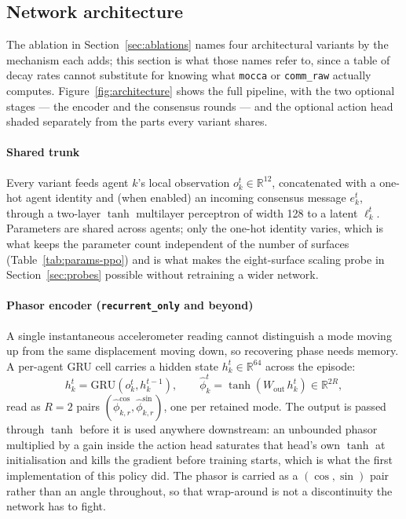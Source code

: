 \documentclass[preprint,11pt,authoryear]{elsarticle}
\begin{document}
\subsection{Network architecture}
\label{sec:architecture}

The ablation in Section~\ref{sec:ablations} names four architectural variants
by the mechanism each adds; this section is what those names refer to, since a
table of decay rates cannot substitute for knowing what \texttt{mocca} or
\texttt{comm\_raw} actually computes. Figure~\ref{fig:architecture} shows the
full pipeline, with the two optional stages --- the encoder and the consensus
rounds --- and the optional action head shaded separately from the parts every
variant shares.

\paragraph{Shared trunk}
Every variant feeds agent $k$'s local observation $o_k^t \in \mathbb{R}^{12}$,
concatenated with a one-hot agent identity and (when enabled) an incoming
consensus message $e_k^t$, through a two-layer $\tanh$ multilayer perceptron of
width 128 to a latent $\ell_k^t$. Parameters are shared across agents; only the
one-hot identity varies, which is what keeps the parameter count independent of
the number of surfaces (Table~\ref{tab:params-ppo}) and is what makes the
eight-surface scaling probe in Section~\ref{sec:probes} possible without
retraining a wider network.

\paragraph{Phasor encoder (\texttt{recurrent\_only} and beyond)}
\label{sec:phasor-encoder}
A single instantaneous accelerometer reading cannot distinguish a mode moving
up from the same displacement moving down, so recovering phase needs memory. A
per-agent GRU cell \citep{hausknecht2015drqn} carries a hidden state
$h_k^t \in \mathbb{R}^{64}$ across the episode:
\begin{equation}
h_k^t = \mathrm{GRU}\!\left(o_k^t, h_k^{t-1}\right), \qquad
\hat\phi_k^t = \tanh\!\left(W_{\mathrm{out}}\, h_k^t\right) \in \mathbb{R}^{2R},
\label{eq:encoder}
\end{equation}
read as $R{=}2$ pairs $(\hat\phi_{k,r}^{\cos}, \hat\phi_{k,r}^{\sin})$, one per
retained mode. The output is passed through $\tanh$ before it is used anywhere
downstream: an unbounded phasor multiplied by a gain inside the action head
saturates that head's own $\tanh$ at initialisation and kills the gradient
before training starts, which is what the first implementation of this policy
did. The phasor is carried as a $(\cos,\sin)$ pair rather than an angle
throughout, so that wrap-around is not a discontinuity the network has to
fight.
\end{document}
